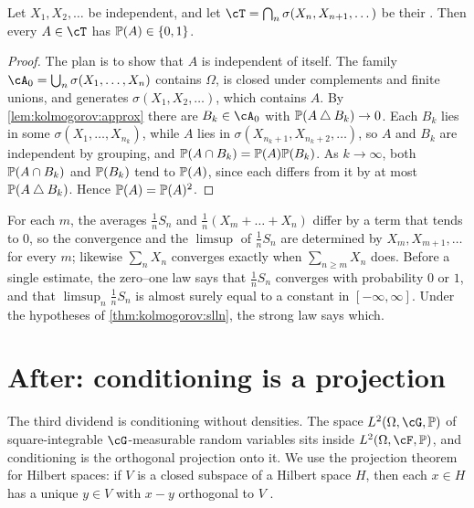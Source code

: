 \begin{refsection}
\begin{theorem}\label{thm:kolmogorov:zeroone}
Let $X_1,X_2,\dots$ be independent, and let $\cT=\bigcap_n\sigma(X_n,X_{n+1},\dots)$ be their . Then every $A\in\cT$ has $\mathbb{P}(A)\in\{0,1\}$.
\end{theorem}

\begin{proof}
The plan is to show that $A$ is independent of itself. The family $\cA_0=\bigcup_n\sigma(X_1,\dots,X_n)$ contains $\Omega$, is closed under complements and finite unions, and generates $\sigma(X_1,X_2,\dots)$, which contains $A$. By \cref{lem:kolmogorov:approx} there are $B_k\in\cA_0$ with $\mathbb{P}(A\mathbin{\triangle} B_k)\to0$. Each $B_k$ lies in some $\sigma(X_1,\dots,X_{n_k})$, while $A$ lies in $\sigma(X_{n_k+1},X_{n_k+2},\dots)$, so $A$ and $B_k$ are independent by grouping, and $\mathbb{P}(A\cap B_k)=\mathbb{P}(A)\mathbb{P}(B_k)$. As $k\to\infty$, both $\mathbb{P}(A\cap B_k)$ and $\mathbb{P}(B_k)$ tend to $\mathbb{P}(A)$, since each differs from it by at most $\mathbb{P}(A\mathbin{\triangle} B_k)$. Hence $\mathbb{P}(A)=\mathbb{P}(A)^2$.
\end{proof}

For each $m$, the averages $\frac1nS_n$ and $\frac1n(X_m+\dots+X_n)$ differ by a term that tends to $0$, so the convergence and the $\limsup$ of $\frac1nS_n$ are determined by $X_m,X_{m+1},\dots$ for every $m$; likewise $\sum_nX_n$ converges exactly when $\sum_{n\ge m}X_n$ does. Before a single estimate, the zero--one law says that $\frac1nS_n$ converges with probability $0$ or $1$, and that $\limsup_n\frac1nS_n$ is almost surely equal to a constant in $[-\infty,\infty]$. Under the hypotheses of \cref{thm:kolmogorov:slln}, the strong law says which.

\section{After: conditioning is a projection}\label{sec:kolmogorov:projection}

The third dividend is conditioning without densities. The space $L^2(\Omega,\cG,\kolP)$ of square-integrable $\cG$-measurable random variables sits inside $L^2(\Omega,\cF,\kolP)$, and conditioning is the orthogonal projection onto it. We use the projection theorem for Hilbert spaces: if $V$ is a closed subspace of a Hilbert space $H$, then each $x\in H$ has a unique $y\in V$ with $x-y$ orthogonal to $V$ \parencite{Williams1991}.


\end{refsection}

